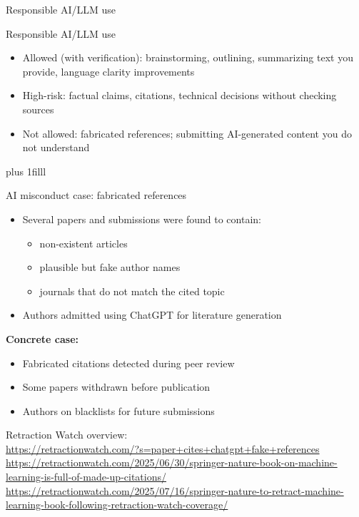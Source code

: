 \documentclass[aspectratio=169]{beamer}
\newcommand{\btVFill}{\vskip0pt plus 1filll}
\begin{document}
\begin{frame}{Responsible AI/LLM use}
\end{frame}

\begin{frame}{Responsible AI/LLM use}
  \begin{itemize}
    \item Allowed (with verification): brainstorming, outlining, summarizing text you provide, language clarity improvements
    \item High-risk: factual claims, citations, technical decisions without checking sources
    \item Not allowed: fabricated references; submitting AI-generated content you do not understand
  \end{itemize}

  \btVFill
\end{frame}


\begin{frame}{AI misconduct case: fabricated references}
  \begin{itemize}
    \item Several papers and submissions were found to contain:
      \begin{itemize}
        \item non-existent articles
        \item plausible but fake author names
        \item journals that do not match the cited topic
      \end{itemize}
    \item Authors admitted using ChatGPT for literature generation
  \end{itemize}

  \vspace{0.5em}
  \textbf{Concrete case:}
  \begin{itemize}
    \item Fabricated citations detected during peer review
    \item Some papers withdrawn before publication
    \item Authors on blacklists for future submissions
  \end{itemize}

  \vspace{0.3em}
  \tiny
  Retraction Watch overview:\\
  \url{https://retractionwatch.com/?s=paper+cites+chatgpt+fake+references}\\
  \url{https://retractionwatch.com/2025/06/30/springer-nature-book-on-machine-learning-is-full-of-made-up-citations/}\\
    \url{https://retractionwatch.com/2025/07/16/springer-nature-to-retract-machine-learning-book-following-retraction-watch-coverage/}
   
 \end{frame}
 
\end{document}
